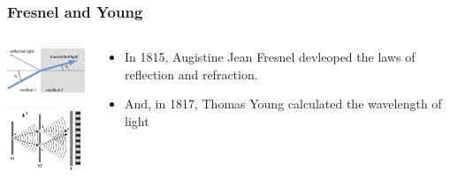 \documentclass{beamer}
\begin{document}
\begin{frame}\frametitle{Fresnel and Young}
\begin{columns}
\begin{column}{3cm}
\begin{center}
\includegraphics[width=3cm]{fig/fresnel.png}

\vspace{0.5cm}

\includegraphics[width=3cm]{fig/youngDoubleSlit.jpg}

\end{center}
\end{column}

\begin{column}{8cm}
\begin{itemize}
\item In 1815, Augistine Jean Fresnel devleoped the laws of reflection and refraction.

\vspace{0.5cm}

\item And, in 1817, Thomas Young calculated the wavelength of light
\end{itemize}
\end{column}
\end{columns}

\end{frame}
\end{document}
